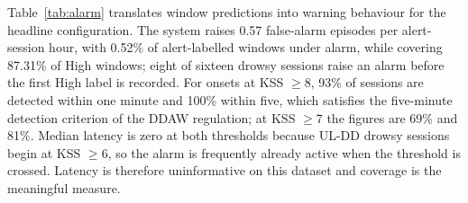 \documentclass[journal]{IEEEtran}
\begin{document}
Table~\ref{tab:alarm} translates window predictions into warning behaviour for
the headline configuration. The system raises 0.57 false-alarm episodes per
alert-session hour, with 0.52\% of alert-labelled windows under alarm, while
covering 87.31\% of High windows; eight of sixteen drowsy sessions raise an alarm
before the first High label is recorded. For onsets at KSS $\ge 8$, 93\% of
sessions are detected within one minute and 100\% within five, which satisfies
the five-minute detection criterion of the DDAW regulation; at KSS $\ge 7$ the
figures are 69\% and 81\%. Median latency is zero at both thresholds because
UL-DD drowsy sessions begin at KSS $\ge 6$, so the alarm is frequently already
active when the threshold is crossed. Latency is therefore uninformative on this
dataset and coverage is the meaningful measure.
\end{document}
